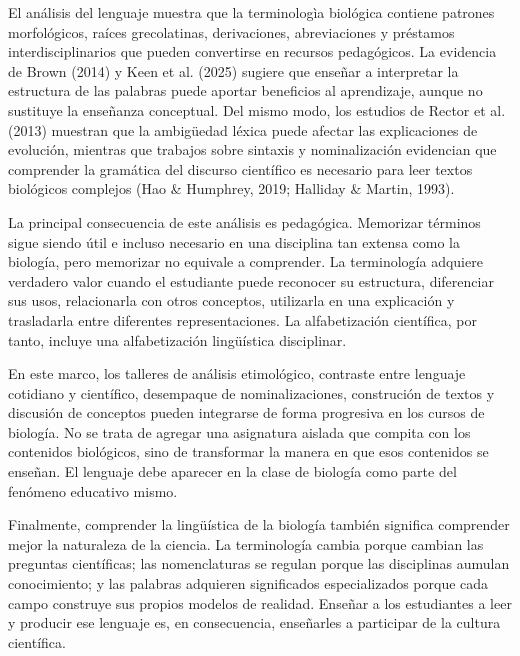 \documentclass[12pt]{article}
\begin{document}
El análisis del lenguaje muestra que la terminologìa biológica contiene patrones morfológicos, raíces grecolatinas, derivaciones, abreviaciones y préstamos interdisciplinarios que pueden convertirse en recursos pedagógicos. La evidencia de Brown (2014) y Keen et al. (2025) sugiere que enseñar a interpretar la estructura de las palabras puede aportar beneficios al aprendizaje, aunque no sustituye la enseñanza conceptual. Del mismo modo, los estudios de Rector et al. (2013) muestran que la ambigüedad léxica puede afectar las explicaciones de evolución, mientras que trabajos sobre sintaxis y nominalización evidencian que comprender la gramática del discurso científico es necesario para leer textos biológicos complejos (Hao & Humphrey, 2019; Halliday & Martin, 1993).

La principal consecuencia de este análisis es pedagógica. Memorizar términos sigue siendo útil e incluso necesario en una disciplina tan extensa como la biología, pero memorizar no equivale a comprender. La terminología adquiere verdadero valor cuando el estudiante puede reconocer su estructura, diferenciar sus usos, relacionarla con otros conceptos, utilizarla en una explicación y trasladarla entre diferentes representaciones. La alfabetización científica, por tanto, incluye una alfabetización lingüística disciplinar.

En este marco, los talleres de análisis etimológico, contraste entre lenguaje cotidiano y científico, desempaque de nominalizaciones, construción de textos y discusión de conceptos pueden integrarse de forma progresiva en los cursos de biología. No se trata de agregar una asignatura aislada que compita con los contenidos biológicos, sino de transformar la manera en que esos contenidos se enseñan. El lenguaje debe aparecer en la clase de biología como parte del fenómeno educativo mismo.

Finalmente, comprender la lingüística de la biología también significa comprender mejor la naturaleza de la ciencia. La terminología cambia porque cambian las preguntas científicas; las nomenclaturas se regulan porque las disciplinas aumulan conocimiento; y las palabras adquieren significados especializados porque cada campo construye sus propios modelos de realidad. Enseñar a los estudiantes a leer y producir ese lenguaje es, en consecuencia, enseñarles a participar de la cultura científica.
\end{document}
